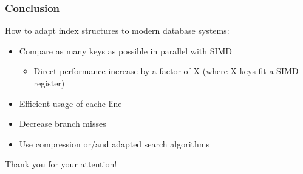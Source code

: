 \documentclass{beamer}
\begin{document}
\begin{frame}
\frametitle{Conclusion}
How to adapt index structures to modern database systems:
\begin{itemize}[label=\textbullet,leftmargin=2em]
\item Compare as many keys as possible in parallel with SIMD
\begin{itemize}[label=\textbullet,leftmargin=1em]
\item Direct performance increase  by a factor of X (where X keys fit a SIMD register)
\end{itemize}
\item Efficient usage of cache line
\item Decrease branch misses
\item Use compression or/and adapted search algorithms
\end{itemize}
\vspace*{\fill}
\begin{center}
\huge Thank you for your attention!
\end{center}
\end{frame}


\begin{frame}


\end{frame}
\end{document}
